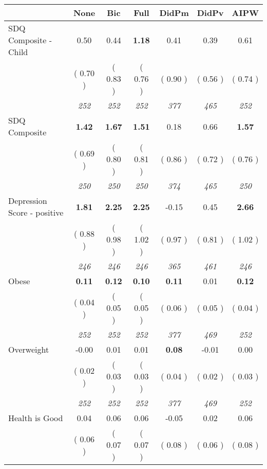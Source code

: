 \begin{tabular}{l c c c c c c}
\toprule
 & None & Bic & Full & DidPm & DidPv & AIPW \\
\midrule
SDQ Composite - Child &      0.50 &      0.44 & \textbf{      1.18 } &      0.41 &      0.39 &      0.61 \\
& (     0.70 ) & (     0.83 ) & (     0.76 ) & (     0.90 ) & (     0.56 ) & (     0.74 ) \\
& \textit{ 252 } & \textit{ 252 } & \textit{ 252 } & \textit{ 377 } & \textit{ 465 } & \textit{ 252 } \\
SDQ Composite & \textbf{      1.42 } & \textbf{      1.67 } & \textbf{      1.51 } &      0.18 &      0.66 & \textbf{     1.57} \\
& (     0.69 ) & (     0.80 ) & (     0.81 ) & (     0.86 ) & (     0.72 ) & (     0.76 ) \\
& \textit{ 250 } & \textit{ 250 } & \textit{ 250 } & \textit{ 374 } & \textit{ 465 } & \textit{ 250 } \\
Depression Score - positive & \textbf{      1.81 } & \textbf{      2.25 } & \textbf{      2.25 } &     -0.15 &      0.45 & \textbf{     2.66} \\
& (     0.88 ) & (     0.98 ) & (     1.02 ) & (     0.97 ) & (     0.81 ) & (     1.02 ) \\
& \textit{ 246 } & \textit{ 246 } & \textit{ 246 } & \textit{ 365 } & \textit{ 461 } & \textit{ 246 } \\
Obese & \textbf{      0.11 } & \textbf{      0.12 } & \textbf{      0.10 } & \textbf{      0.11 } &      0.01 & \textbf{     0.12} \\
& (     0.04 ) & (     0.05 ) & (     0.05 ) & (     0.06 ) & (     0.05 ) & (     0.04 ) \\
& \textit{ 252 } & \textit{ 252 } & \textit{ 252 } & \textit{ 377 } & \textit{ 469 } & \textit{ 252 } \\
Overweight &     -0.00 &      0.01 &      0.01 & \textbf{      0.08 } &     -0.01 &      0.00 \\
& (     0.02 ) & (     0.03 ) & (     0.03 ) & (     0.04 ) & (     0.02 ) & (     0.03 ) \\
& \textit{ 252 } & \textit{ 252 } & \textit{ 252 } & \textit{ 377 } & \textit{ 469 } & \textit{ 252 } \\
Health is Good &      0.04 &      0.06 &      0.06 &     -0.05 &      0.02 &      0.06 \\
& (     0.06 ) & (     0.07 ) & (     0.07 ) & (     0.08 ) & (     0.06 ) & (     0.08 ) \\

\end{tabular}
